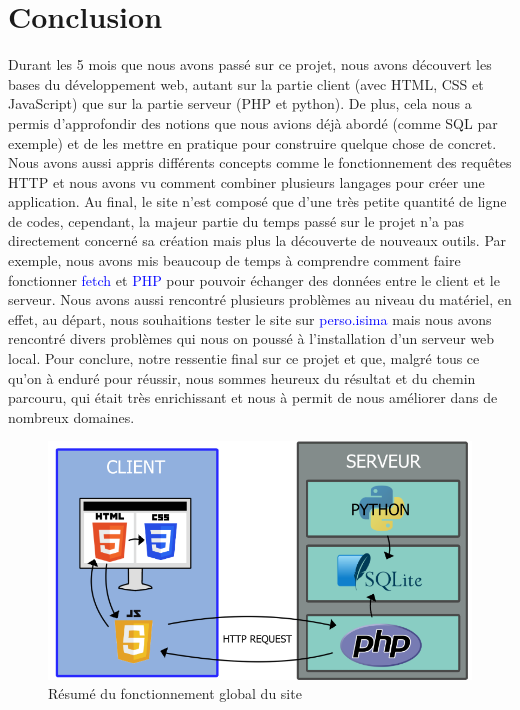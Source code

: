 \documentclass[a4paper]{article}
\renewcommand{\texttt}[2][blue]{\textcolor{#1}{\ttfamily #2}}
\begin{document}
  \newpage

  \section{Conclusion}%
  \label{sec:Conclusion}

  Durant les 5 mois que nous avons passé sur ce projet, nous avons découvert
  les bases du développement web, autant sur la partie client (avec HTML, CSS
  et JavaScript) que sur la partie serveur (PHP et python). De plus, cela nous
  a permis d'approfondir des notions que nous avions déjà abordé (comme SQL par
  exemple) et de les mettre en pratique pour construire quelque chose de
  concret. Nous avons aussi appris différents concepts comme le fonctionnement
  des requêtes HTTP et nous avons vu comment combiner plusieurs langages pour
  créer une application. Au final, le site n'est composé que d'une très petite
  quantité de ligne de codes, cependant, la majeur partie du temps passé sur le
  projet n'a pas directement concerné sa création mais plus la découverte de
  nouveaux outils. Par exemple, nous avons mis beaucoup de temps à comprendre
  comment faire fonctionner \texttt{fetch} et \texttt{PHP} pour pouvoir
  échanger des données entre le client et le serveur. Nous avons aussi
  rencontré plusieurs problèmes au niveau du matériel, en effet, au départ,
  nous souhaitions tester le site sur \texttt{perso.isima} mais nous avons
  rencontré divers problèmes qui nous on poussé à l'installation d'un serveur
  web local. Pour conclure, notre ressentie final sur ce projet et que, malgré
  tous ce qu'on à enduré pour réussir, nous sommes heureux du résultat et du
  chemin parcouru, qui était très enrichissant et nous à permit de nous
  améliorer dans de nombreux domaines.

  \begin{figure}[htbp]
    \centering
    \includegraphics[scale=0.45]{./img_rapport/shema_global.png}
    \caption{Résumé du fonctionnement global du site}
    \label{fig-page-web-v1}
  \end{figure}
\end{document}
